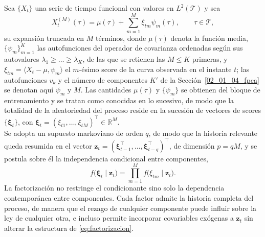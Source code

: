 Sea $\{X_t\}$ una serie de tiempo funcional con valores en $L^2(\mathcal{T})$ y sea
\begin{equation}\label{eq:expansion_kl_truncada}
    X_t^{(M)}(\tau) = \mu(\tau)
    + \sum_{m=1}^{M} \xi_{tm}\psi_m(\tau),
    \qquad \tau \in \mathcal{T},
\end{equation}
su expansión truncada en $M$ términos, donde $\mu(\tau)$ denota la función media, $\{\psi_m\}_{m=1}^{K}$ las autofunciones del operador de covarianza ordenadas según sus autovalores $\lambda_1 \geq \dots \geq \lambda_K$, de las que se retienen las $M \leq K$ primeras, y $\xi_{tm} = \langle X_t - \mu, \psi_m\rangle$ el $m$-ésimo score de la curva observada en el instante $t$; las autofunciones $v_k$ y el número de componentes $K'$ de la Sección~\ref{02_01_04_fpca} se denotan aquí $\psi_m$ y $M$. Las cantidades $\mu(\tau)$ y $\{\psi_m\}$ se obtienen del bloque de entrenamiento y se tratan como conocidas en lo sucesivo, de modo que la totalidad de la aleatoriedad del proceso reside en la sucesión de vectores de scores $\{\boldsymbol{\xi}_t\}$, con $\boldsymbol{\xi}_t = (\xi_{t1},\dots,\xi_{tM})^\top \in \mathbb{R}^{M}$.\\

Se adopta un supuesto markoviano de orden $q$, de modo que la historia relevante queda resumida en el vector $\mathbf{z}_t = (\boldsymbol{\xi}_{t-1}^\top, \dots, \boldsymbol{\xi}_{t-q}^\top)^\top$, de dimensión $p = qM$, y se postula sobre él la independencia condicional entre componentes,
\begin{equation}\label{eq:factorizacion}
    f\bigl(\boldsymbol{\xi}_t \mid \mathbf{z}_t\bigr)
    = \prod_{m=1}^{M} f\bigl(\xi_{tm} \mid \mathbf{z}_t\bigr).
\end{equation}
La factorización no restringe el condicionante sino solo la dependencia contemporánea entre componentes. Cada factor admite la historia completa del proceso, de manera que el rezago de cualquier componente puede influir sobre la ley de cualquier otra, e incluso permite incorporar covariables exógenas a $\mathbf{z}_t$ sin alterar la estructura de \eqref{eq:factorizacion}.\\


